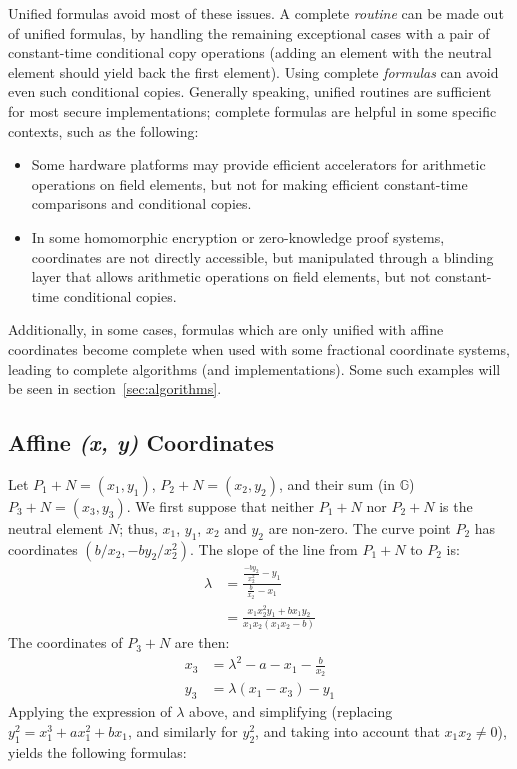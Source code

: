 \documentclass{llncs}
\newcommand{\bG}{\mathbb{G}}
\begin{document}
Unified formulas avoid most of these issues. A complete \emph{routine}
can be made out of unified formulas, by handling the remaining
exceptional cases with a pair of constant-time conditional copy
operations (adding an element with the neutral element should yield back
the first element). Using complete \emph{formulas} can avoid even such
conditional copies. Generally speaking, unified routines are sufficient
for most secure implementations; complete formulas are helpful in some
specific contexts, such as the following:
\begin{itemize}

    \item Some hardware platforms may provide efficient accelerators
    for arithmetic operations on field elements, but not for making
    efficient constant-time comparisons and conditional copies.

    \item In some homomorphic encryption or zero-knowledge proof
    systems, coordinates are not directly accessible, but manipulated
    through a blinding layer that allows arithmetic operations on field
    elements, but not constant-time conditional copies.

\end{itemize}

Additionally, in some cases, formulas which are only unified with affine
coordinates become complete when used with some fractional coordinate
systems, leading to complete algorithms (and implementations). Some such
examples will be seen in section~\ref{sec:algorithms}.

\subsection{Affine \emph{(x, y)} Coordinates}\label{sec:formulas:xy}

Let $P_1+N = (x_1,y_1)$, $P_2+N = (x_2,y_2)$, and their sum (in $\bG$)
$P_3+N = (x_3,y_3)$. We first suppose that neither $P_1+N$ nor $P_2+N$
is the neutral element $N$; thus, $x_1$, $y_1$, $x_2$ and $y_2$ are
non-zero. The curve point $P_2$ has coordinates $(b/x_2, -by_2/x_2^2)$.
The slope of the line from $P_1+N$ to $P_2$ is:
\begin{align*}
    \lambda &= \frac{\frac{-by_2}{x_2^2} - y_1}{\frac{b}{x_2} - x_1} \\
    &= \frac{x_1 x_2^2 y_1 + b x_1 y_2}{x_1 x_2 (x_1 x_2 - b)}
\end{align*}
The coordinates of $P_3+N$ are then:
\begin{align*}
    x_3 &= \lambda^2 - a - x_1 - \frac{b}{x_2} \\
    y_3 &= \lambda (x_1 - x_3) - y_1
\end{align*}
Applying the expression of $\lambda$ above, and simplifying (replacing
$y_1^2 = x_1^3 + ax_1^2 + bx_1$, and similarly for $y_2^2$, and taking
into account that $x_1 x_2 \neq 0$), yields the following formulas:
\end{document}
